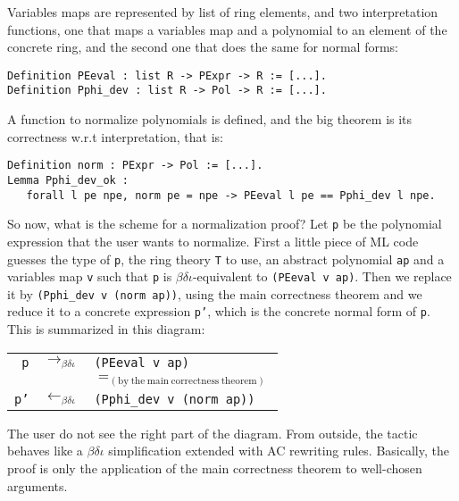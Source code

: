 Variables maps are represented by list of ring elements, and two
interpretation functions, one that maps a variables map and a
polynomial to an element of the concrete ring, and the second one that
does the same for normal forms:
\begin{small}
\begin{flushleft}
\begin{verbatim}
Definition PEeval : list R -> PExpr -> R := [...].
Definition Pphi_dev : list R -> Pol -> R := [...].
\end{verbatim}
\end{flushleft}
\end{small}

A function to normalize polynomials is defined, and the big theorem is
its correctness w.r.t interpretation, that is:

\begin{small}
\begin{flushleft}
\begin{verbatim}
Definition norm : PExpr -> Pol := [...].
Lemma Pphi_dev_ok :
   forall l pe npe, norm pe = npe -> PEeval l pe == Pphi_dev l npe.
\end{verbatim}
\end{flushleft}
\end{small}

So now, what is the scheme for a normalization proof? Let \texttt{p}
be the polynomial expression that the user wants to normalize. First a
little piece of ML code guesses the type of \texttt{p}, the ring
theory \texttt{T} to use, an abstract polynomial \texttt{ap} and a
variables map \texttt{v} such that \texttt{p} is
$\beta\delta\iota$-equivalent to \verb|(PEeval v ap)|. Then we
replace it by \verb|(Pphi_dev v (norm ap))|, using the
main correctness theorem and we reduce it to a concrete expression
\texttt{p'}, which is the concrete normal form of
\texttt{p}. This is summarized in this diagram:
\begin{center}
\begin{tabular}{rcl}
\texttt{p} & $\rightarrow_{\beta\delta\iota}$  
   & \texttt{(PEeval v ap)} \\
 & & $=_{\mathrm{(by\ the\ main\ correctness\ theorem)}}$ \\
\texttt{p'} 
   & $\leftarrow_{\beta\delta\iota}$ 
   & \texttt{(Pphi\_dev v (norm ap))}
\end{tabular}
\end{center}
The user do not see the right part of the diagram. 
From outside, the tactic behaves like a
$\beta\delta\iota$ simplification extended with AC rewriting rules.
Basically, the proof is only the application of the main
correctness theorem to well-chosen arguments.


